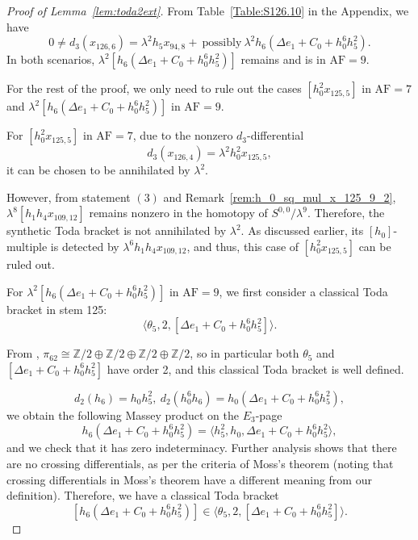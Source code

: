 \documentclass{amsart}
\numberwithin{equation}{section}
\newcommand{\AF}{\mathrm{AF}}
\begin{document}
\begin{proof}[Proof of Lemma~\ref{lem:toda2ext}]

From Table~\ref{Table:S126.10} in the Appendix, we have
$$0 \neq d_3(x_{126,6}) = \lambda^2 h_5 x_{94,8} + \ \text{possibly} \ \lambda^2 h_6(\Delta e_1 +C_0+h_0^6h_5^2).$$ 
In both scenarios, $\lambda^2 [h_6(\Delta e_1 +C_0+h_0^6h_5^2)]$ remains and is in $\AF=9$.

For the rest of the proof, we only need to rule out the cases $[h_0^2 x_{125,5}]$ in $\AF=7$ and $\lambda^2 [h_6(\Delta e_1 +C_0+h_0^6h_5^2)]$ in $\AF=9$. 

For $[h_0^2 x_{125,5}]$ in $\AF=7$, due to the nonzero $d_3$-differential
$$d_3(x_{126,4}) = \lambda^2 h_0^2 x_{125,5},$$
it can be chosen to be annihilated by $\lambda^2$. 

However, from statement $(3)$ and Remark~\ref{rem:h_0_sq_mul_x_125_9_2}, $\lambda^8 [h_1h_4x_{109,12}]$ remains nonzero in the homotopy of $S^{0,0}/\lambda^9$. Therefore, the synthetic Toda bracket is not annihilated by $\lambda^2$. As discussed earlier, its $[h_0]$-multiple is detected by $\lambda^6 h_1h_4x_{109,12}$, and thus, this case of $[h_0^2 x_{125,5}]$ can be ruled out.



For $\lambda^2 [h_6(\Delta e_1 +C_0+h_0^6h_5^2)]$ in $\AF=9$, we first consider a classical Toda bracket in stem 125:
$$\langle \theta_5, 2, [\Delta e_1 +C_0+h_0^6h_5^2] \rangle.$$

From \cite{Xu, IWX}, $\pi_{62} \cong \mathbb{Z}/2 \oplus \mathbb{Z}/2 \oplus \mathbb{Z}/2 \oplus \mathbb{Z}/2$, so in particular both $\theta_5$ and $[\Delta e_1 +C_0+h_0^6h_5^2]$ have order 2, and this classical Toda bracket is well defined.


$$d_2(h_6) = h_0h_5^2, \ d_2(h_0^6h_6)= h_0(\Delta e_1 +C_0+h_0^6h_5^2),$$
we obtain the following Massey product on the $E_3$-page
$$h_6(\Delta e_1 +C_0+h_0^6h_5^2) = \langle h_5^2, h_0, \Delta e_1 +C_0+h_0^6h_5^2 \rangle,$$
and we check that it has zero indeterminacy. Further analysis shows that there are no crossing differentials, as per the criteria of Moss's theorem \cite[Theorem~1.2]{Moss} (noting that crossing differentials in Moss's theorem have a different meaning from our definition). Therefore, we have a classical Toda bracket 
$$[h_6(\Delta e_1 +C_0+h_0^6h_5^2)] \in \langle \theta_5, 2, [\Delta e_1 +C_0+h_0^6h_5^2] \rangle.$$


\end{proof}
\end{document}

